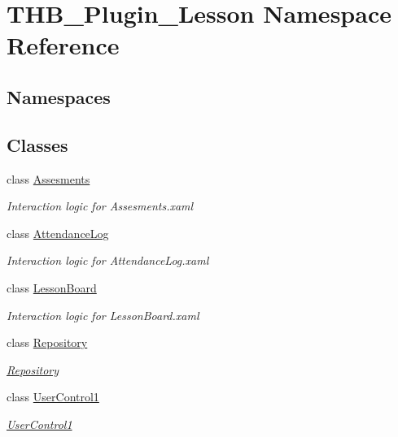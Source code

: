 \hypertarget{namespace_t_h_b___plugin___lesson}{}\section{T\+H\+B\+\_\+\+Plugin\+\_\+\+Lesson Namespace Reference}
\label{namespace_t_h_b___plugin___lesson}
\subsection*{Namespaces}
\begin{DoxyCompactItemize}
\end{DoxyCompactItemize}
\subsection*{Classes}
\begin{DoxyCompactItemize}
\item 
class \mbox{\hyperlink{class_t_h_b___plugin___lesson_1_1_assesments}{Assesments}}
\begin{DoxyCompactList}\small\item\em Interaction logic for Assesments.\+xaml \end{DoxyCompactList}\item 
class \mbox{\hyperlink{class_t_h_b___plugin___lesson_1_1_attendance_log}{Attendance\+Log}}
\begin{DoxyCompactList}\small\item\em Interaction logic for Attendance\+Log.\+xaml \end{DoxyCompactList}\item 
class \mbox{\hyperlink{class_t_h_b___plugin___lesson_1_1_lesson_board}{Lesson\+Board}}
\begin{DoxyCompactList}\small\item\em Interaction logic for Lesson\+Board.\+xaml \end{DoxyCompactList}\item 
class \mbox{\hyperlink{class_t_h_b___plugin___lesson_1_1_repository}{Repository}}
\begin{DoxyCompactList}\small\item\em \mbox{\hyperlink{class_t_h_b___plugin___lesson_1_1_repository}{Repository}} \end{DoxyCompactList}\item 
class \mbox{\hyperlink{class_t_h_b___plugin___lesson_1_1_user_control1}{User\+Control1}}
\begin{DoxyCompactList}\small\item\em \mbox{\hyperlink{class_t_h_b___plugin___lesson_1_1_user_control1}{User\+Control1}} \end{DoxyCompactList}\end{DoxyCompactItemize}
